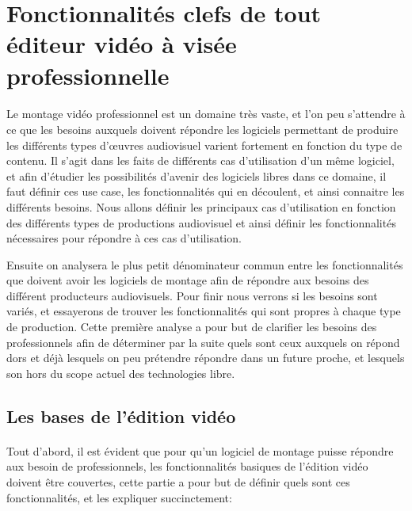 \newpage
\section{Fonctionnalités clefs de tout éditeur vidéo à visée
  professionnelle}

\paragraph{}
  Le montage vidéo professionnel est un domaine très vaste, et l'on peu
  s'attendre à ce que les besoins auxquels doivent répondre les logiciels
  permettant de produire les différents types d'œuvres audiovisuel
  varient fortement en fonction du type de contenu. Il s'agit dans les faits
  de différents cas d'utilisation d'un même logiciel, et afin d'étudier
  les possibilités d'avenir des logiciels libres dans ce domaine, il faut
  définir ces use case, les fonctionnalités qui en découlent, et ainsi connaitre
  les différents besoins.  Nous allons définir les principaux cas d'utilisation en fonction des
  différents types de productions audiovisuel et ainsi définir les fonctionnalités
  nécessaires pour répondre à ces cas d'utilisation.

  Ensuite on analysera le plus petit dénominateur commun entre les
  fonctionnalités que doivent avoir les logiciels de montage afin de répondre
  aux besoins des différent producteurs audiovisuels. Pour finir
  nous verrons si les besoins sont variés, et essayerons de trouver les
  fonctionnalités qui sont propres à chaque type de production. Cette première
  analyse a pour but de clarifier les besoins des professionnels afin de
  déterminer par la suite quels sont ceux auxquels on répond dors et déjà %
  lesquels on peu prétendre répondre dans un future proche, et lesquels
  son hors du scope actuel des technologies libre.

  \subsection{Les bases de l'édition vidéo}
    \paragraph{}
      Tout d'abord, il est évident que pour qu'un logiciel de montage puisse répondre
      aux besoin de professionnels, les fonctionnalités basiques de l'édition vidéo
      doivent être couvertes, cette partie a pour but de définir quels sont ces
      fonctionnalités, et les expliquer succinctement:

